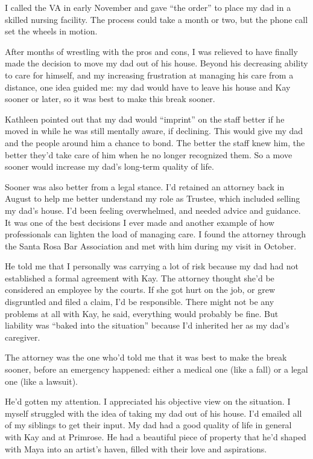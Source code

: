 \documentclass[12pt]{book}
\begin{document}
I called the VA in early November and gave ``the order'' to place my dad in a skilled nursing facility. The process could take a month or two, but the phone call set the wheels in motion.

After months of wrestling with the pros and cons, I was relieved to have finally made the decision to move my dad out of his house. Beyond his decreasing ability to care for himself, and my increasing frustration at managing his care from a distance, one idea guided me: my dad would have to leave his house and Kay sooner or later, so it was best to make this break sooner.

Kathleen pointed out that my dad would ``imprint'' on the staff better if he moved in while he was still mentally aware, if declining. This would give my dad and the people around him a chance to bond. The better the staff knew him, the better they'd take care of him when he no longer recognized them. So a move sooner would increase my dad's long-term quality of life.

Sooner was also better from a legal stance. I'd retained an attorney back in August to help me better understand my role as Trustee, which included selling my dad's house. I'd been feeling overwhelmed, and needed advice and guidance. It was one of the best decisions I ever made and another example of how professionals can lighten the load of managing care. I found the attorney through the Santa Rosa Bar Association and met with him during my visit in October.

He told me that I personally was carrying a lot of risk because my dad had not established a formal agreement with Kay. The attorney thought she'd be considered an employee by the courts. If she got hurt on the job, or grew disgruntled and filed a claim, I'd be responsible. There might not be any problems at all with Kay, he said, everything would probably be fine. But liability was ``baked into the situation'' because I'd inherited her as my dad's caregiver.

The attorney was the one who'd told me that it was best to make the break sooner, before an emergency happened: either a medical one (like a fall) or a legal one (like a lawsuit).

He'd gotten my attention. I appreciated his objective view on the situation. I myself struggled with the idea of taking my dad out of his house. I'd emailed all of my siblings to get their input. My dad had a good quality of life in general with Kay and at Primrose. He had a beautiful piece of property that he'd shaped with Maya into an artist's haven, filled with their love and aspirations.
\end{document}
